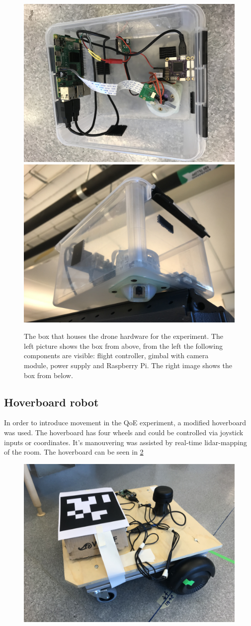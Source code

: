 \documentclass[nofilelist]{cslthse-msc}
\begin{document}
\begin{figure}[htp]
   \centering
   \includegraphics[width=.47\textwidth]{images/drone-box-1.jpg}\hfill
   \includegraphics[width=.47\textwidth]{images/drone-box-2.jpg}
   \caption{The box that houses the drone hardware for the experiment. The left picture shows the box from above, from the left the following components are visible: flight controller, gimbal with camera module, power supply and Raspberry Pi. The right image shows the box from below.}
   \label{fig:drone-setup}
\end{figure}

\subsection{Hoverboard robot}
In order to introduce movement in the QoE experiment, a modified hoverboard was used. The hoverboard has four wheels and could be controlled via joystick inputs or coordinates. It's manouvering was assisted by real-time lidar-mapping of the room. The hoverboard can be seen in \ref{fig:hoverboard}

\begin{figure}[!hbt]
   \centering
   \includegraphics[scale=0.07]{images/hoverboard.jpg} 
   \caption{}
   \label{fig:hoverboard}
\end{figure}
\end{document}
